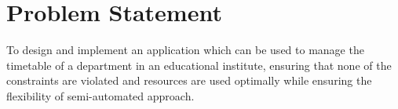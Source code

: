 			
\section{Problem Statement}

To design and implement an application which can be used to manage the timetable of a department in an educational institute, ensuring that none of the constraints are violated and resources are used optimally while ensuring the flexibility of semi-automated approach.


